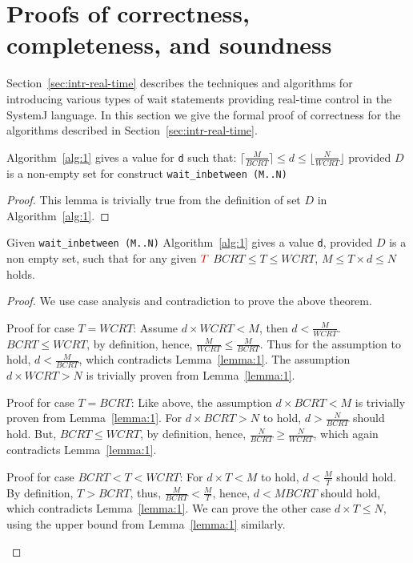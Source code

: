 \section{Proofs of correctness, completeness, and soundness}
\label{sec:proof-correctness}

Section~\ref{sec:intr-real-time} describes the techniques and algorithms
for introducing various types of wait statements providing real-time
control in the SystemJ language. In this section we give the formal
proof of correctness for the algorithms described in
Section~\ref{sec:intr-real-time}.

\begin{lemma}
  Algorithm~\ref{alg:1} gives a value for \texttt{d} such that: $\lceil
  \frac{M}{BCRT} \rceil \leq d \leq \lfloor \frac{N}{WCRT} \rfloor$
  provided $D$ is a non-empty set for construct \texttt{wait\_inbetween
    (M..N)}
\label{lemma:1}
\end{lemma}
\begin{proof}
  This lemma is trivially true from the definition of set $D$ in
  Algorithm~\ref{alg:1}.
\end{proof}

\begin{theorem}
  Given \texttt{wait\_inbetween (M..N)} Algorithm~\ref{alg:1} gives a
  value \texttt{d}, provided $D$ is a non empty set, such that for any
	given $\textcolor{red}{T}$  $BCRT \leq T \leq WCRT$, $M \leq T \times d \leq N$ holds.
\label{th:1}
\end{theorem}
\begin{proof}
  We use case analysis and contradiction to prove the above theorem.
  \begin{compactenum}[\hspace{0.25cm} 1.]
  \item Proof for case $T = WCRT$: Assume \mbox{$d \times WCRT < M$},
    then $d < \frac{M}{WCRT}$. $BCRT \leq WCRT$, by definition, hence,
    $\frac{M}{WCRT} \leq \frac{M}{BCRT}$. Thus for the assumption to
    hold, $d < \frac{M}{BCRT}$, which contradicts
    Lemma~\ref{lemma:1}. The assumption $d \times WCRT >N$ is trivially
    proven from Lemma~\ref{lemma:1}.
  \item Proof for case $T = BCRT$: Like above, the assumption $d \times
    BCRT < M$ is trivially proven from Lemma~\ref{lemma:1}. For $d
    \times BCRT > N$ to hold, $d > \frac{N}{BCRT}$ should hold. But,
    $BCRT \leq WCRT$, by definition, hence, $\frac{N}{BCRT} \geq
    \frac{N}{WCRT}$, which again contradicts Lemma~\ref{lemma:1}.
  \item Proof for case $BCRT < T < WCRT$: For $d \times T < M$ to hold,
    $d < \frac{M}{T}$ should hold. By definition, $T > BCRT$, thus,
    $\frac{M}{BCRT} < \frac{M}{T}$, hence, $d < {M}{BCRT}$ should hold,
    which contradicts Lemma~\ref{lemma:1}. We can prove the other case
    $d \times T \leq N$, using the upper bound from Lemma~\ref{lemma:1}
    similarly.
  \end{compactenum}
\end{proof}

